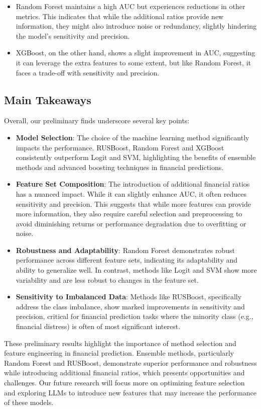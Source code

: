 \documentclass[conference]{IEEEtran}
\begin{document}
\begin{itemize}
\item Random Forest maintains a high AUC but experiences reductions in other metrics. This indicates that while the additional ratios provide new information, they might also introduce noise or redundancy, slightly hindering the model’s sensitivity and precision.
\item XGBoost, on the other hand, shows a slight improvement in AUC, suggesting it can leverage the extra features to some extent, but like Random Forest, it faces a trade-off with sensitivity and precision. \end{itemize}\subsection{Main Takeaways} Overall, our preliminary finds underscore several key points: \begin{itemize} 
\item \textbf{Model Selection}: The choice of the machine learning method significantly impacts the performance. RUSBoost, Random Forest and XGBoost consistently outperform Logit and SVM, highlighting the benefits of ensemble methods and advanced boosting techniques in financial predictions.
\item \textbf{Feature Set Composition}: The introduction of additional financial ratios has a nuanced impact. While it can slightly enhance AUC, it often reduces sensitivity and precision. This suggests that while more features can provide more information, they also require careful selection and preprocessing to avoid diminishing returns or performance degradation due to overfitting or noise.
\item \textbf{Robustness and Adaptability}: Random Forest demonstrates robust performance across different feature sets, indicating its adaptability and ability to generalize well. In contrast, methods like Logit and SVM show more variability and are less robust to changes in the feature set.
\item \textbf{Sensitivity to Imbalanced Data}: Methods like RUSBoost, specifically address the class imbalance, show marked improvements in sensitivity and precision, critical for financial prediction tasks where the minority class (e.g., financial distress) is often of most significant interest.
 \end{itemize} These preliminary results highlight the importance of method selection and feature engineering in financial prediction. Ensemble methods, particularly Random Forest and RUSBoost, demonstrate superior performance and robustness while introducing additional financial ratios, which presents opportunities and challenges. Our future research will focus more on optimizing feature selection and exploring LLMs to introduce new features that may increase the performance of these models. 
 
\end{document}
